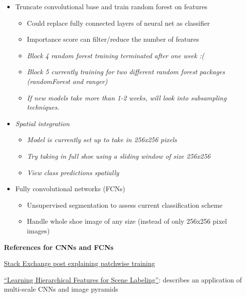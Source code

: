 \documentclass[]{book}
\providecommand{\tightlist}{%
  \setlength{\itemsep}{0pt}\setlength{\parskip}{0pt}}
\begin{document}
\begin{itemize}
\tightlist
\item
  Truncate convolutional base and train random forest on features

  \begin{itemize}
  \tightlist
  \item
    Could replace fully connected layers of neural net as classifier
  \item
    Importance score can filter/reduce the number of features
  \item
    \emph{Block 4 random forest training terminated after one week :( }
  \item
    \emph{Block 5 currently training for two different random forest packages (randomForest and ranger)}
  \item
    \emph{If new models take more than 1-2 weeks, will look into subsampling techniques.}
  \end{itemize}
\item
  \emph{Spatial integration}

  \begin{itemize}
  \tightlist
  \item
    \emph{Model is currently set up to take in 256x256 pixels}
  \item
    \emph{Try taking in full shoe using a sliding window of size 256x256}
  \item
    \emph{View class predictions spatially}
  \end{itemize}
\item
  Fully convolutional networks (FCNs)

  \begin{itemize}
  \tightlist
  \item
    Unsupervised segmentation to assess current classification scheme
  \item
    Handle whole shoe image of any size (instead of only 256x256 pixel images)
  \end{itemize}
\end{itemize}

\textbf{References for CNNs and FCNs}

\href{https://stats.stackexchange.com/questions/266075/patch-wise-training-and-fully-convolutional-training-in-fully-convolutional-neur}{Stack Exchange post explaining patchwise training}

\href{https://ieeexplore.ieee.org/abstract/document/6338939}{``Learning Hierarchical Features for Scene Labeling''}: describes an application of multi-scale CNNs and image pyramids
\end{document}

